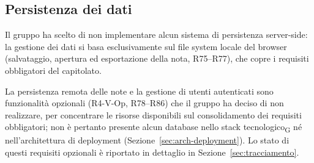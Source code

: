 \subsection{Persistenza dei dati}
\label{sec:persistenza}
Il gruppo ha scelto di non implementare alcun sistema di persistenza server-side: 
la gestione dei dati si basa esclusivamente sul file system locale del browser (salvataggio, apertura ed 
esportazione della nota, R75--R77), che copre i requisiti obbligatori del capitolato. 

La persistenza remota delle note e la gestione di utenti autenticati sono funzionalità opzionali (R4-V-Op, R78--R86) che il gruppo ha deciso di non realizzare, per concentrare le risorse disponibili sul consolidamento dei requisiti obbligatori; non è pertanto presente alcun database nello stack tecnologico\textsubscript{G} né nell'architettura di deployment (Sezione~\ref{sec:arch-deployment}). Lo stato di questi requisiti opzionali è riportato in dettaglio in Sezione~\ref{sec:tracciamento}.

